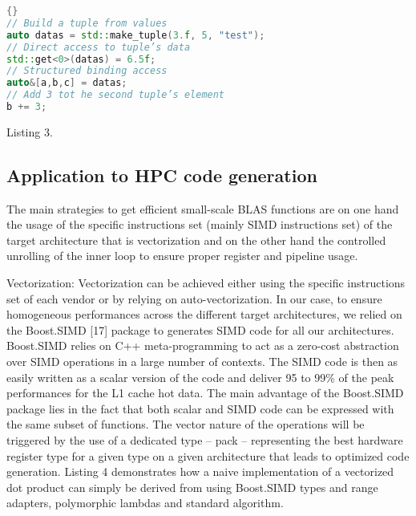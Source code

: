 \documentclass[../../main.tex]{subfiles}
\begin{document}
\begin{itemize}
\begin{lstlisting}[language=c++, caption=Tuple and structured bindings]{}
// Build a tuple from values
auto datas = std::make_tuple(3.f, 5, "test");
// Direct access to tuple’s data
std::get<0>(datas) = 6.5f;
// Structured binding access
auto&[a,b,c] = datas;
// Add 3 tot he second tuple’s element
b += 3;
\end{lstlisting}
Listing 3.

\end{itemize}

\subsection{Application to HPC code generation}

The main strategies to get efficient small-scale BLAS
functions are on one hand the usage of the specific
instructions set (mainly SIMD instructions set) of the target
architecture that is vectorization and on the other hand the
controlled unrolling of the inner loop to ensure proper register
and pipeline usage.

\item Vectorization: Vectorization can be achieved either
using the specific instructions set of each vendor or
by relying on auto-vectorization. In our case, to ensure
homogeneous performances across the different target
architectures, we relied on the Boost.SIMD [17] package
to generates SIMD code for all our architectures.
Boost.SIMD relies on C++ meta-programming to act as
a zero-cost abstraction over SIMD operations in a large
number of contexts. The SIMD code is then as easily
written as a scalar version of the code and deliver 95%
to 99\% of the peak performances for the L1 cache hot
data. The main advantage of the Boost.SIMD package
lies in the fact that both scalar and SIMD code can
be expressed with the same subset of functions. The
vector nature of the operations will be triggered by
the use of a dedicated type – pack – representing the
best hardware register type for a given type on a given
architecture that leads to optimized code generation.
Listing 4 demonstrates how a naive implementation of a
vectorized dot product can simply be derived from using
Boost.SIMD types and range adapters, polymorphic
lambdas and standard algorithm.
\end{document}
